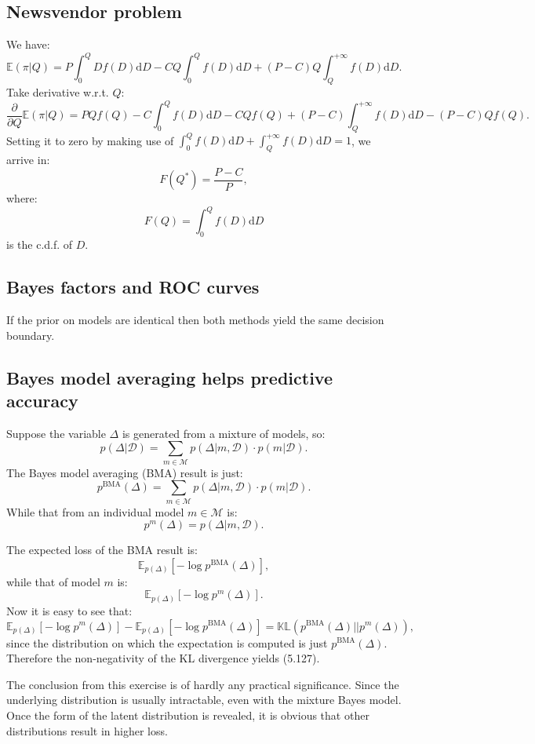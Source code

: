 \documentclass[UTF8]{ctexart}
\begin{document}
\subsection{Newsvendor problem}
We have:
$$\mathbb{E}(\pi|Q)=P\int_{0}^{Q}Df(D)\text{d}D-CQ\int_{0}^{Q}f(D)\text{d}D+(P-C)Q\int_{Q}^{+\infty}f(D)\text{d}D.$$
Take derivative w.r.t. $Q$:
$$\frac{\partial}{\partial Q}\mathbb{E}(\pi|Q) = PQf(Q)-C\int_{0}^{Q}f(D)\text{d}D-CQf(Q)+(P-C)\int_{Q}^{+\infty}f(D)\text{d}D-(P-C)Qf(Q).$$
Setting it to zero by making use of $\int_{0}^{Q}f(D)\text{d}D + \int_{Q}^{+\infty}f(D)\text{d}D=1$, we arrive in:
$$F(Q^{*})=\frac{P-C}{P},$$
where:
$$F(Q)=\int_{0}^{Q}f(D)\text{d}D$$
is the c.d.f. of $D$.

\subsection{Bayes factors and ROC curves}
If the prior on models are identical then both methods yield the same decision boundary.

\subsection{Bayes model averaging helps predictive accuracy}
Suppose the variable $\Delta$ is generated from a mixture of models, so:
$$p(\Delta|\mathcal{D})=\sum_{m\in\mathcal{M}}p(\Delta|m,\mathcal{D})\cdot p(m|\mathcal{D}).$$
The Bayes model averaging (BMA) result is just:
$$p^{\text{BMA}}(\Delta)=\sum_{m\in\mathcal{M}}p(\Delta|m,\mathcal{D})\cdot p(m|\mathcal{D}).$$
While that from an individual model $m\in \mathcal{M}$ is:
$$p^{m}(\Delta)=p(\Delta|m,\mathcal{D}).$$

The expected loss of the BMA result is:
$$\mathbb{E}_{p(\Delta)}[-\log p^{\text{BMA}}(\Delta)],$$
while that of model $m$ is:
$$\mathbb{E}_{p(\Delta)}[-\log p^{m}(\Delta)].$$
Now it is easy to see that:
$$\mathbb{E}_{p(\Delta)}[-\log p^{m}(\Delta)]-\mathbb{E}_{p(\Delta)}[-\log p^{\text{BMA}}(\Delta)]=\mathbb{KL}(p^{\text{BMA}}(\Delta)||p^{m}(\Delta)),$$
since the distribution on which the expectation is computed is just $p^{\text{BMA}}(\Delta)$.
Therefore the non-negativity of the KL divergence yields (5.127).

The conclusion from this exercise is of hardly any practical significance.
Since the underlying distribution is usually intractable, even with the mixture Bayes model.
Once the form of the latent distribution is revealed, it is obvious that other distributions result in higher loss.
\end{document}
